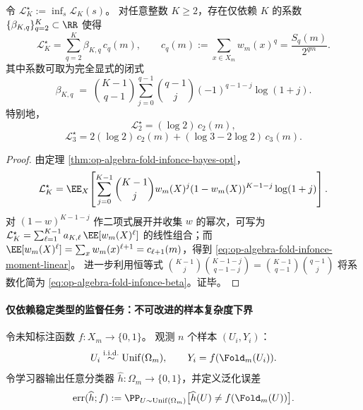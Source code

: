 \begin{proposition}\label{prop:op-algebra-fold-infonce-finiteK-moment-formula}
令 \(\mathcal L_K^\star:=\inf_s\mathcal L_K(s)\)。
对任意整数 \(K\ge 2\)，存在仅依赖 \(K\) 的系数 \(\{\beta_{K,q}\}_{q=2}^{K}\subset\RR\) 使得
\begin{equation}\label{eq:op-algebra-fold-infonce-moment-linear}
\mathcal L_K^\star=\sum_{q=2}^{K}\beta_{K,q}\,c_q(m),
\qquad
c_q(m):=\sum_{x\in X_m}w_m(x)^q=\frac{S_q(m)}{2^{qm}}.
\end{equation}
其中系数可取为完全显式的闭式
\begin{equation}\label{eq:op-algebra-fold-infonce-beta}
\beta_{K,q}
\;=\;
\binom{K-1}{q-1}\sum_{j=0}^{q-1}\binom{q-1}{j}(-1)^{q-1-j}\log(1+j).
\end{equation}
特别地，
\[
\mathcal L_2^\star=(\log 2)\,c_2(m),
\]
\[
\mathcal L_3^\star=2(\log 2)\,c_2(m)+(\log 3-2\log 2)\,c_3(m).
\]
\end{proposition}
\begin{proof}
由定理 \ref{thm:op-algebra-fold-infonce-bayes-opt}，
\[
\mathcal L_K^\star
=\EE_X\!\left[\sum_{j=0}^{K-1}\binom{K-1}{j}w_m(X)^j(1-w_m(X))^{K-1-j}\log(1+j)\right].
\]
对 \((1-w)^{K-1-j}\) 作二项式展开并收集 \(w\) 的幂次，可写为
\(
\mathcal L_K^\star=\sum_{\ell=1}^{K-1}a_{K,\ell}\,\EE[w_m(X)^\ell]
\)
的线性组合；而 \(\EE[w_m(X)^\ell]=\sum_x w_m(x)^{\ell+1}=c_{\ell+1}(m)\)，得到
\eqref{eq:op-algebra-fold-infonce-moment-linear}。
进一步利用恒等式
\(
\binom{K-1}{j}\binom{K-1-j}{q-1-j}=\binom{K-1}{q-1}\binom{q-1}{j}
\)
将系数化简为 \eqref{eq:op-algebra-fold-infonce-beta}。证毕。
\end{proof}

\paragraph{仅依赖稳定类型的监督任务：不可改进的样本复杂度下界}\label{par:op-algebra-fold-supervised-lowerbound}
令未知标注函数 \(f:X_m\to\{0,1\}\)。
观测 \(n\) 个样本 \((U_i,Y_i)\)：
\[
U_i\stackrel{\mathrm{i.i.d.}}{\sim}\mathrm{Unif}(\Omega_m),
\qquad
Y_i=f(\Fold_m(U_i)).
\]
令学习器输出任意分类器 \(\widehat h:\Omega_m\to\{0,1\}\)，并定义泛化误差
\[
\mathrm{err}(\widehat h;f):=\PP_{U\sim\mathrm{Unif}(\Omega_m)}\bigl[\widehat h(U)\neq f(\Fold_m(U))\bigr].
\]

